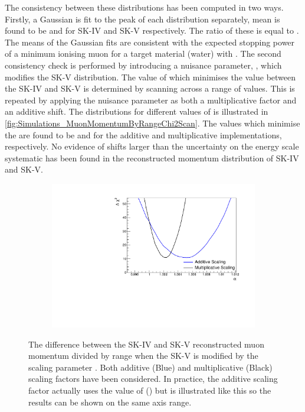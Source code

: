 The consistency between these distributions has been computed in two ways. Firstly, a Gaussian is fit to the peak of each distribution separately,   mean  is found to be  and  for SK-IV and SK-V respectively. The ratio of these is equal to . The means of the Gaussian fits are consistent with the expected stopping power of a minimum ionising muon for a target material (water) with  \cite{PhysRevD.86.010001}. The second consistency check is performed by introducing a nuisance parameter, \quickmath{\alpha}, which modifies the SK-V distribution. The value of \quickmath{\alpha} which minimises the  value between the SK-IV and SK-V is determined by scanning across a range of values. This is repeated by applying the nuisance parameter as both a multiplicative factor and an additive shift. The  distributions for different values of \quickmath{\alpha} is illustrated in \autoref{fig:Simulations_MuonMomentumByRangeChi2Scan}. The values which minimise the  are found to be  and  for the additive and multiplicative implementations, respectively. No evidence of shifts larger than the  uncertainty on the energy scale systematic has been found in the reconstructed momentum distribution of SK-IV and SK-V.

\begin{figure}[h]
  \begin{subfigure}[t]{\textwidth}
    \includegraphics[width=\textwidth, trim={0mm 0mm 0mm 0mm}, clip, page=1]{Figures/Simulations/MuonRange_Chi2Scan.pdf}
  \end{subfigure}
  \caption{The  difference between the SK-IV and SK-V reconstructed muon momentum divided by range when the SK-V is modified by the scaling parameter \quickmath{\alpha}. Both additive (Blue) and multiplicative (Black) scaling factors have been considered. In practice, the additive scaling factor actually uses the value of () but is illustrated like this so the results can be shown on the same axis range.}
  \label{fig:Simulations_MuonMomentumByRangeChi2Scan}
\end{figure}

